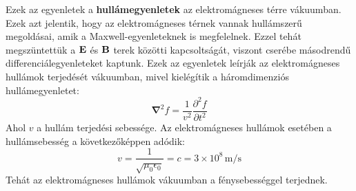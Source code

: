 \documentclass[a4paper,12pt]{article}
\begin{document}
Ezek az egyenletek a \textbf{hullámegyenletek} az elektromágneses térre vákuumban. Ezek azt jelentik, hogy az elektromágneses térnek vannak hullámszerű megoldásai, amik a Maxwell-egyenleteknek is megfelelnek.
Ezzel tehát megszüntettük a $\bold{E}$ és $\bold{B}$ terek közötti kapcsoltságát, viszont cserébe másodrendű differenciálegyenleteket kaptunk. Ezek az egyenletek leírják az elektromágneses hullámok terjedését vákuumban,
mivel kielégítik a háromdimenziós hullámegyenletet:
\begin{equation}
    \boldsymbol{\nabla}^2 f = \frac{1}{v^2} \frac{\partial^2 f}{\partial t^2}
\end{equation}
Ahol $v$ a hullám terjedési sebessége. Az elektromágneses hullámok esetében a hullámsebesség a következőképpen adódik:
\begin{equation}
    v = \frac{1}{\sqrt{\mu_0 \epsilon_0}} = c = 3 \times 10^8 \, \text{m/s}
\end{equation}
Tehát az elektromágneses hullámok vákuumban a fénysebességgel terjednek.
\end{document}
